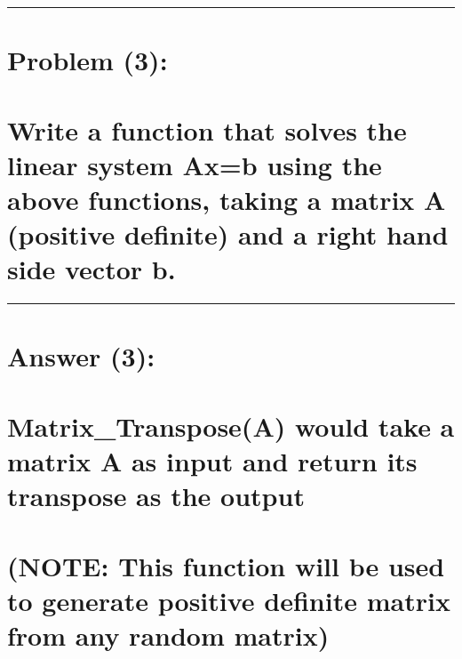 \documentclass[11pt]{article}
\begin{document}
    \begin{center}\rule{0.5\linewidth}{0.5pt}\end{center}

    \hypertarget{problem-3}{%
\section{Problem (3):}\label{problem-3}}

    \hypertarget{write-a-function-that-solves-the-linear-system-axb-using-the-above-functions-taking-a-matrix-a-positive-definite-and-a-right-hand-side-vector-b.}{%
\section{Write a function that solves the linear system Ax=b using the
above functions, taking a matrix A (positive definite) and a right hand
side vector
b.}\label{write-a-function-that-solves-the-linear-system-axb-using-the-above-functions-taking-a-matrix-a-positive-definite-and-a-right-hand-side-vector-b.}}

    \begin{center}\rule{0.5\linewidth}{0.5pt}\end{center}

    \hypertarget{answer-3}{%
\section{Answer (3):}\label{answer-3}}

    \hypertarget{matrix_transposea-would-take-a-matrix-a-as-input-and-return-its-transpose-as-the-output}{%
\section{Matrix\_Transpose(A) would take a matrix A as input and return
its transpose as the
output}\label{matrix_transposea-would-take-a-matrix-a-as-input-and-return-its-transpose-as-the-output}}

\hypertarget{note-this-function-will-be-used-to-generate-positive-definite-matrix-from-any-random-matrix}{%
\section{(NOTE: This function will be used to generate positive definite
matrix from any random
matrix)}\label{note-this-function-will-be-used-to-generate-positive-definite-matrix-from-any-random-matrix}}
\end{document}
